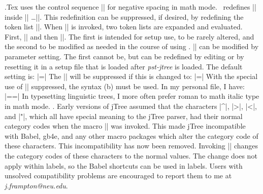 .\enspace Tex uses the control sequence |\!| for negative
spacing in math mode.  \jTree\ redefines |\!| inside |\jtree|
\dots|\endjtree|. This redefinition can be suppressed, if
desired, by redefining the token list |\jtEverytree|.  When
|\jtree| is invoked, two token lists are expanded and evaluated.
First, |\jtEverytree| and then
|\jteverytree|. The first is intended for
setup use, to be rarely altered, and the second to be modified as
needed in the course of using \jTree. |\jteverytree| can be
modified by parameter setting.  The first cannot be, but can be
redefined by editing \pstjtree\/ or by resetting it in a setup
file that is loaded after {\sl pst-jtree\/} is loaded.  The
default setting is:
\medskip
\hfil|\jtEverytree={\let\!\adjoinop}|
\medskip
The |\!| will be suppressed if this is changed to:
\medskip
\hfil|\jtEverytree={}|
\medskip
With the special use of |\!| suppressed,
the syntax (\lastx b) must be used.\medskip
In my personal file, I have:
\medskip
\hfil|\jtEverytree={\everymath={\rm}\let\!\adjoinop}|
\medskip
In typesetting linguistic trees, I more often prefer roman
to math italic type in math mode.
.\enspace
Early versions of jTree assumed that the characters |^|, |>|,
|<|, and |"|, which all have special meaning to the jTree parser,
had their normal category codes when the macro |\jtree| was
invoked.  This made jTree incompatible with Babel, gb4e, and any
other macro packages which alter the category code of these
characters.  This incompatibility has now been removed.  Invoking
|\jtree| changes the category codes of these characters to the
normal values.  The change does not apply within labels, so the
Babel shortcuts can be used in labels. Users with unsolved
compatibility problems are encouraged to report them to me at
{\sl j.frampton@neu.edu\/}.




